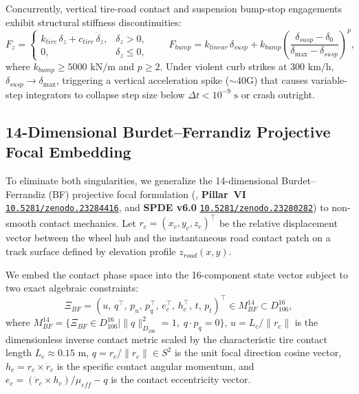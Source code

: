 \documentclass[11pt,a4paper,reqno]{article}
\def\bm#1{#1}%
\def\mathrm#1{#1}%
\def\mathcal#1{#1}%
\def\mathbb#1{#1}%
\newcommand{\zenodo}[1]{\href{https://doi.org/10.5281/zenodo.#1}{\nolinkurl{10.5281/zenodo.#1}}}
\theoremstyle{plain}
\theoremstyle{definition}
\theoremstyle{remark}
\numberwithin{equation}{section}
\begin{document}
Concurrently, vertical tire-road contact and suspension bump-stop engagements exhibit structural stiffness discontinuities:
\begin{equation}
  F_z = \begin{cases}
    k_{\mathrm{tire}}\,\delta_z + c_{\mathrm{tire}}\,\dot{\delta}_z, & \delta_z > 0, \\
    0, & \delta_z \le 0,
  \end{cases} \qquad
  F_{\mathrm{bump}} = k_{\mathrm{linear}}\,\delta_{\mathrm{susp}} + k_{\mathrm{bump}}\left(\frac{\delta_{\mathrm{susp}} - \delta_0}{\delta_{\max} - \delta_{\mathrm{susp}}}\right)^{\!p},
  \label{eq:bumpstop_singularity}
\end{equation}
where $k_{\mathrm{bump}} \ge 5000\text{ kN/m}$ and $p \ge 2$. Under violent curb strikes at $300\text{ km/h}$, $\delta_{\mathrm{susp}} \to \delta_{\max}$, triggering a vertical acceleration spike ($\sim 40\text{G}$) that causes variable-step integrators to collapse step size below $\Delta t < 10^{-9}\text{ s}$ or crash outright.

\subsection{14-Dimensional Burdet--Ferrandiz Projective Focal Embedding}
To eliminate both singularities, we generalize the 14-dimensional Burdet--Ferrandiz (BF) projective focal formulation (\cite{Ferrandiz1988, Burdet1969}, \textbf{Pillar~VI} \zenodo{23284416}, and \textbf{SPDE v6.0} \zenodo{23280282}) to non-smooth contact mechanics. Let $\bm{r}_c = (x_c, y_c, z_c)^\top$ be the relative displacement vector between the wheel hub and the instantaneous road contact patch on a track surface defined by elevation profile $z_{\mathrm{road}}(x, y)$.

We embed the contact phase space into the 16-component state vector subject to two exact algebraic constraints:
\begin{equation}
  \bm{\Xi}_{\mathrm{BF}} = \left( u,\, \bm{q}^\top,\, p_u,\, \bm{p}_q^\top,\, \bm{e}_c^\top,\, \bm{h}_c^\top,\, t,\, p_t \right)^\top \in \mathcal{M}_{\mathrm{BF}}^{14} \subset \mathbb{D}_{106}^{16},
  \label{eq:bf_f1_state}
\end{equation}
where $\mathcal{M}_{\mathrm{BF}}^{14} = \{ \bm{\Xi}_{\mathrm{BF}} \in \mathbb{D}_{106}^{16} \mid \|\bm{q}\|_{\mathbb{D}_{106}}^2 = 1,\; \bm{q} \cdot \bm{p}_q = 0 \}$, $u = L_c / \|\bm{r}_c\|$ is the dimensionless inverse contact metric scaled by the characteristic tire contact length $L_c \approx 0.15\text{ m}$, $\bm{q} = \bm{r}_c / \|\bm{r}_c\| \in S^2$ is the unit focal direction cosine vector, $\bm{h}_c = \bm{r}_c \times \dot{\bm{r}}_c$ is the specific contact angular momentum, and $\bm{e}_c = (\dot{\bm{r}}_c \times \bm{h}_c)/\mu_{\mathrm{eff}} - \bm{q}$ is the contact eccentricity vector.
\end{document}

